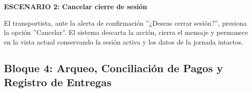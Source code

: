\documentclass[a4paper,9pt]{article}
\begin{document}
\begin{tcolorbox}[hucard, title={\textbf{HU-156: CERRAR SESIÓN} \hfill \scriptsize \colorbox{bluestatus}{\textbf{\ New\ }} \quad \colorbox{white}{\textcolor{primarydark}{\textbf{\ 2 pts\ }}}}]
{\noindent\textbf{\textcolor{secondarydark}{ESCENARIO 2:  Cancelar cierre de sesión}}\par\vspace{1pt}
El transportista, ante la alerta de confirmación ''¿Deseas cerrar sesión?'', presiona la opción ''Cancelar''. El sistema descarta la acción, cierra el mensaje y permanece en la vista actual conservando la sesión activa y los datos de la jornada intactos.\par\vspace{2.5pt}
}\par
\end{tcolorbox}

\subsection{Bloque 4: Arqueo, Conciliación de Pagos y Registro de Entregas}
\end{document}
